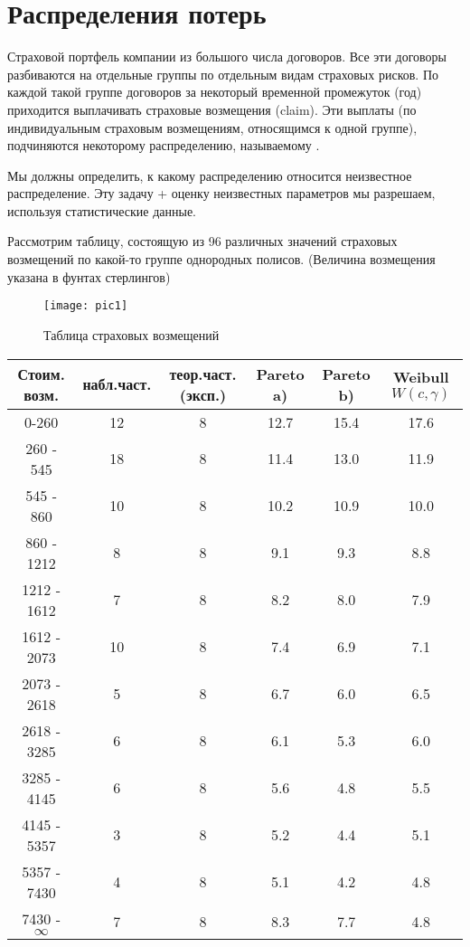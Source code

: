 \section{Распределения потерь} %

Страховой портфель компании из большого числа договоров. Все эти договоры разбиваются на отдельные группы по отдельным видам страховых рисков. По каждой такой группе договоров за некоторый временной промежуток (год) приходится выплачивать страховые возмещения (claim). Эти выплаты (по индивидуальным страховым возмещениям, относящимся к одной группе), подчиняются некоторому распределению, называемому .

Мы должны определить, к какому распределению относится неизвестное распределение. Эту задачу + оценку неизвестных параметров мы разрешаем, используя статистические данные.

Рассмотрим таблицу, состоящую из 96 различных значений страховых возмещений по какой-то группе однородных полисов. (Величина возмещения указана в фунтах стерлингов)

\begin{figure}[h]
\centering
\texttt{[image: pic1]}
\caption{Таблица страховых возмещений}
\end{figure}



\begin{center}
	\begin{tabular}{ |c|c|c|c|c|c|} 
	 \hline
	 Стоим. возм. & набл.част. & теор.част.(эксп.) &  Pareto a) & Pareto b) & Weibull $W(c,\gamma)$ \\
	 \hline 
	 0-260 & 12 & 8 & 12.7 & 15.4 & 17.6 \\ 
	 \hline
	260 - 545 & 18 & 8 & 11.4 & 13.0 & 11.9 \\ 
	 \hline
	 545 - 860 & 10 & 8 & 10.2 & 10.9 & 10.0\\ 
	 \hline
	 860 - 1212 & 8 & 8 & 9.1 & 9.3 & 8.8 \\ 
	 \hline
	 1212 - 1612 & 7 & 8 & 8.2 & 8.0 & 7.9 \\ 
	 \hline
	 1612 - 2073 & 10 & 8 & 7.4 & 6.9 & 7.1 \\ 
	 \hline
	 2073 - 2618 & 5 & 8 & 6.7 & 6.0 & 6.5 \\ 
	 \hline
	 2618 - 3285 & 6 & 8 & 6.1 & 5.3 & 6.0 \\ 
	 \hline
	 3285 - 4145 & 6 & 8 & 5.6 & 4.8 & 5.5 \\ 
	 \hline
	 4145 - 5357 & 3 & 8 & 5.2 & 4.4 & 5.1 \\ 
	 \hline
	 5357 - 7430 & 4 & 8 & 5.1 & 4.2 & 4.8 \\ 
	 \hline
	 7430 - $\infty$ & 7 & 8 & 8.3 & 7.7 & 4.8 \\ 
	 \hline
	\end{tabular}
\end{center}


